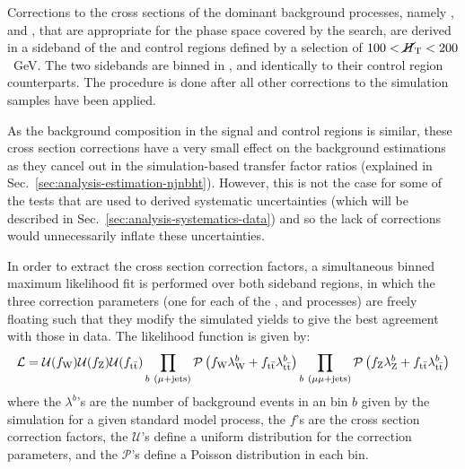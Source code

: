 Corrections to the cross sections of the dominant background processes, namely 
\zj, \wj and \ttbar, that are appropriate for the phase space covered by the 
search, are derived in a sideband of the \mj and \mmj control 
regions defined by a selection of $100<\mbox{$\cancel{H}_\text{T}$}<200$~GeV.
The two \mht sidebands are binned in \njet, \nb and \scalht identically to 
their control region counterparts.
The procedure is done after all other corrections to the simulation samples 
have been applied.



As the background composition in the signal and control regions is similar, 
these cross section corrections have a very small effect on the background 
estimations as they cancel out in the simulation-based transfer factor ratios 
(explained in 
Sec.~\ref{sec:analysis-estimation-njnbht}). However, this is not the case for 
some of the tests that are used to derived systematic uncertainties (which will 
be described in Sec.~\ref{sec:analysis-systematics-data}) and so the lack of 
corrections would unnecessarily inflate these uncertainties.


In order to extract the cross section correction factors, a simultaneous binned 
maximum likelihood fit is performed over both \mht sideband regions, in which 
the three correction parameters (one for each of the \zj, \wj and \ttbar 
processes) are freely floating such that they modify the simulated yields to 
give the best agreement with those in data. The likelihood function is given by:
\begin{equation}
\mathcal{L} = \mathcal{U}(f_{\mathrm W}) \mathcal{U}(f_{\mathrm Z}) 
\mathcal{U}(f_{\mathrm{t\bar{t}}}) 
\prod_{b~(\mu+\mathrm{jets})} 
\mathcal{P}\left(f_{\mathrm W} \lambda_{\mathrm W}^b + 
f_{\mathrm{t\bar{t}}} \lambda_{\mathrm{t\bar{t}}}^b\right) \prod_{b~(\mu\mu+\mathrm{jets})} 
\mathcal{P}\left(f_{\mathrm 
Z} \lambda_{\mathrm Z}^b + f_{\mathrm{t\bar{t}}} \lambda_{\mathrm{t\bar{t}}}^b\right)
\end{equation}
where the $\lambda^b$'s are the number of background events in an \njnbht bin 
$b$ given by the simulation for a given standard model process, the $f$'s are 
the cross section correction factors, the $\mathcal{U}$'s define a uniform 
distribution for the correction parameters, and the $\mathcal{P}$'s define a 
Poisson distribution in each bin. 

